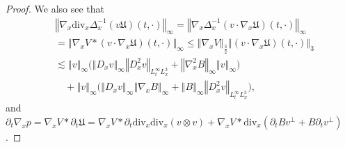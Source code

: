 \documentclass[11pt,reqno]{amsart}
\numberwithin{equation}{section}
\begin{document}
\begin{proof}
We also see that
\begin{align*}
&\left\Vert \nabla_{x}\mathrm{div}_{x}\Delta^{-1}_{x}(v\mathfrak{U})(t,\cdot)\right\Vert_{\infty}=\left\Vert \nabla_{x}\Delta^{-1}_{x}(v\cdot \nabla_{x}\mathfrak{U})(t,\cdot)\right\Vert_{\infty}\\
&= \left\Vert \nabla_{x}V\ast (v\cdot \nabla_{x}\mathfrak{U})(t,\cdot)\right\Vert_{\infty}\leq \left\Vert \nabla_{x}V\right\Vert_{\frac{3}{2}}\left\Vert (v\cdot \nabla_{x}\mathfrak{U})(t,\cdot)\right\Vert_{3}\\
&\lesssim \left\Vert v\right\Vert_{\infty}\big(\left\Vert D_{x}v\right\Vert_{\infty}\left\Vert D_{x}^{2}v\right\Vert_{L^{\infty}_{t}L^3_{x}}+\left\Vert \nabla_{x}^{2}B\right\Vert_{\infty}\left\Vert v\right\Vert_{\infty}\big)\\
&\quad+\left\Vert v\right\Vert_{\infty}\big(\left\Vert D_{x}v\right\Vert_{\infty}\left\Vert \nabla_{x}B\right\Vert_{\infty}+\left\Vert B\right\Vert_{\infty}\left\Vert D_{x}^{2}
v\right\Vert_{L^\infty_{t}L^{3}_{x}}\big),          
\end{align*}
and
$\partial_{t}\nabla_{x}p=\nabla_{x}V\ast \partial_{t}\mathfrak{U}=\nabla_{x}V\ast \partial_{t}\mathrm{div}_{x}\mathrm{div}_{x}(v\otimes v)+\nabla_{x}V\ast \mathrm{div}_{x}(\partial_{t}Bv^{\perp}+B\partial_{t}v^{\perp})$.


\end{proof}
\end{document}
